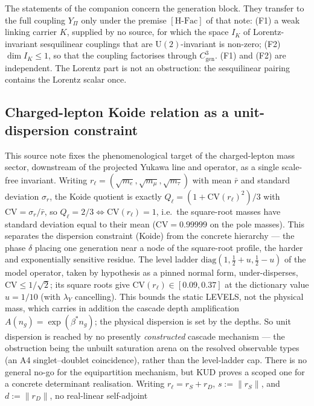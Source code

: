 \documentclass[11pt,a4paper]{article}
\theoremstyle{definition}
\newcommand{\UU}{\mathrm{U}}
\newcommand{\Cgen}{C^3_{\mathrm{gen}}}
\newcommand{\HFac}{\ensuremath{[\mathrm{H\text{-}Fac}]}}
\newcommand{\Ypi}{Y_\Pi}
\begin{document}
      The statements of the companion concern the generation block.
      They transfer to the full coupling $\Ypi$ only under the premise \HFac{} of that note: (F1) a weak linking
      carrier $K$, supplied by no source, for which the space $I_K$ of Lorentz-invariant sesquilinear couplings that
      are $\UU(2)$-invariant is non-zero; (F2) $\dim I_K\leq1$, so that the coupling factorises through $\Cgen$.
      (F1) and (F2) are independent.
      The Lorentz part is not an obstruction: the sesquilinear pairing contains the Lorentz scalar once.

    \subsection{Charged-lepton Koide relation as a unit-dispersion constraint~\cite{Beau2026kud}}
      This source note fixes the phenomenological target of the charged-lepton mass sector, downstream of the
      projected Yukawa line and operator, as a single scale-free invariant.
      Writing $r_\ell=(\sqrt{m_e},\sqrt{m_\mu},\sqrt{m_\tau})$ with mean $\bar r$ and standard deviation
      $\sigma_r$, the Koide quotient is exactly $Q_\ell=(1+\mathrm{CV}(r_\ell)^2)/3$ with
      $\mathrm{CV}=\sigma_r/\bar r$, so $Q_\ell=2/3\iff\mathrm{CV}(r_\ell)=1$, i.e.\ the square-root masses have
      standard deviation equal to their mean ($\mathrm{CV}=0.99999$ on the pole masses).
      This separates the dispersion constraint (Koide) from the concrete hierarchy --- the phase $\delta$ placing
      one generation near a node of the square-root profile, the harder and exponentially sensitive residue.
      The level ladder $\mathrm{diag}(1,\tfrac12+u,\tfrac12-u)$ of the model operator, taken by hypothesis as a pinned
      normal form, under-disperses, $\mathrm{CV}\le1/\sqrt2$;
      its square roots give $\mathrm{CV}(r_\ell)\in[0.09,0.37]$ at the dictionary value $u=1/10$ (with $\lambda_Y$
      cancelling).
      This bounds the static LEVELS, not the physical mass, which carries in addition the cascade depth
      amplification $A(n_g)=\exp(\beta^\ast n_g)$; the physical dispersion is set by the depths.
      So unit dispersion is reached by no presently \emph{constructed} cascade mechanism --- the obstruction being
      the unbuilt saturation arena on the resolved observable types (an A4 singlet--doublet coincidence),
      rather than the level-ladder cap.
      There is no general no-go for the equipartition mechanism, but KUD proves a scoped one for a concrete
      determinant realisation.
      Writing $r_\ell=r_S+r_D$, $s:=\lVert r_S\rVert$, and $d:=\lVert r_D\rVert$, no real-linear self-adjoint
\end{document}

